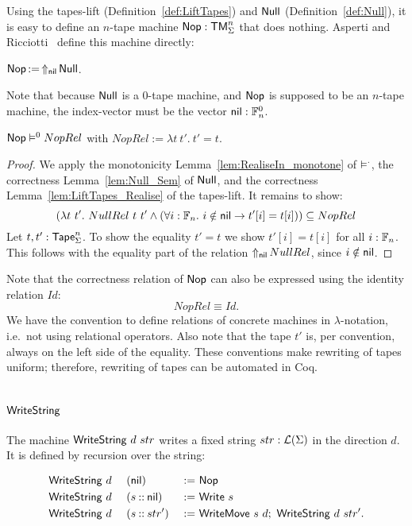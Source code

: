 Using the tapes-lift (Definition~\ref{def:LiftTapes}) and $\mathsf{Null}$ (Definition~\ref{def:Null}), it is easy to define an $n$-tape machine
$\mathsf{Nop} : \mathsf{TM}_\Sigma^n$ that does nothing.  Asperti and Ricciotti~\cite{asperti2015} define this machine directly:
\begin{definition}[$\Nop$][Nop]
  $\mathsf{Nop} \mathop{:=} \mathop{\Uparrow_{\mathsf{nil}}} \mathsf{Null}$.
\end{definition}
Note that because $\mathsf{Null}$ is a 0-tape machine, and $\Nop$ is supposed to be an $n$-tape machine, the index-vector must be the vector
$\mathsf{nil} : \mathbb{F}_n^0$.

\begin{lemma}
  \label{lem:Nop_Sem}
  $\mathsf{Nop} \mathrel{\vDash^{0}} NopRel$ with $NopRel := \lambda t~t'.~t'=t$.
\end{lemma}
\begin{proof}
  We apply the monotonicity Lemma~\ref{lem:RealiseIn_monotone} of $\mathrel{\vDash^{\cdot}}$, the correctness Lemma~\ref{lem:Null_Sem} of $\mathsf{Null}$, and the
  correctness Lemma~\ref{lem:LiftTapes_Realise} of the tapes-lift.  It remains to show:
  \[
    \left( \lambda t~t'.~ NullRel~t~t' \land \left(\forall i:\mathbb{F}_n.~i \notin \mathsf{nil} \rightarrow t'[i] = t[i] \right)\right)
    \subseteq NopRel
  \]
  Let $t,t' : \mathsf{Tape}_\Sigma^n$.  To show the equality $t'=t$ we show $t'[i]=t[i]$ for all $i:\mathbb{F}_n$.  This follows with the equality part of the
  relation $\mathop{\Uparrow_{\mathsf{nil}}} NullRel$, since $i \notin \mathsf{nil}$.
\end{proof}

Note that the correctness relation of $\Nop$ can also be expressed using the identity relation $Id$:
\[
  NopRel \equiv Id.
\]
We have the convention to define relations of concrete machines in $\lambda$-notation, i.e.\ not using relational operators.  Also note that the tape
$t'$ is, per convention, always on the left side of the equality.  These conventions make rewriting of tapes uniform; therefore, rewriting of tapes
can be automated in Coq.

\section{$\MS{WriteString}$}
\label{sec:WriteString}
%

The machine $\mathsf{WriteString}~d~str$ writes a fixed string $str:\mathcal{L}(\Sigma)$ in the direction $d$.  It is defined by recursion over the string:
\begin{definition}[$\MS{WriteString}$][WriteString]
  \begin{alignat*}{3}
    &\mathsf{WriteString}~d~&&(\mathsf{nil})         &~:=~& \mathsf{Nop} \\
    &\mathsf{WriteString}~d~&&(s \mathbin{::} \mathsf{nil}) &~:=~& \mathsf{Write}~s \\
    &\mathsf{WriteString}~d~&&(s \mathbin{::} str') &~:=~& \mathsf{WriteMove}~s~d ;~ \mathsf{WriteString}~d~str'.
  \end{alignat*}
\end{definition}

